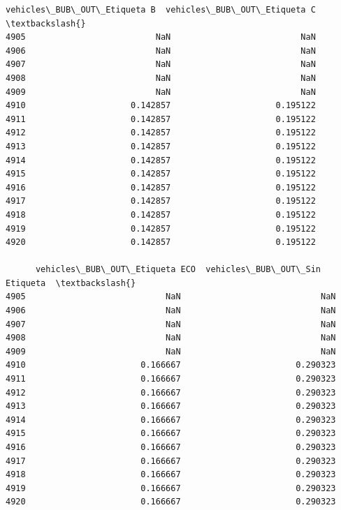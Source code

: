 \documentclass[11pt]{article}
\begin{document}
\begin{tcolorbox}[breakable, size=fbox, boxrule=.5pt, pad at break*=1mm, opacityfill=0]
\begin{Verbatim}[commandchars=\\\{\}]
      vehicles\_BUB\_OUT\_Etiqueta B  vehicles\_BUB\_OUT\_Etiqueta C  \textbackslash{}
4905                          NaN                          NaN
4906                          NaN                          NaN
4907                          NaN                          NaN
4908                          NaN                          NaN
4909                          NaN                          NaN
4910                     0.142857                     0.195122
4911                     0.142857                     0.195122
4912                     0.142857                     0.195122
4913                     0.142857                     0.195122
4914                     0.142857                     0.195122
4915                     0.142857                     0.195122
4916                     0.142857                     0.195122
4917                     0.142857                     0.195122
4918                     0.142857                     0.195122
4919                     0.142857                     0.195122
4920                     0.142857                     0.195122

      vehicles\_BUB\_OUT\_Etiqueta ECO  vehicles\_BUB\_OUT\_Sin Etiqueta  \textbackslash{}
4905                            NaN                            NaN
4906                            NaN                            NaN
4907                            NaN                            NaN
4908                            NaN                            NaN
4909                            NaN                            NaN
4910                       0.166667                       0.290323
4911                       0.166667                       0.290323
4912                       0.166667                       0.290323
4913                       0.166667                       0.290323
4914                       0.166667                       0.290323
4915                       0.166667                       0.290323
4916                       0.166667                       0.290323
4917                       0.166667                       0.290323
4918                       0.166667                       0.290323
4919                       0.166667                       0.290323
4920                       0.166667                       0.290323


\end{Verbatim}
\end{tcolorbox}
\end{document}
